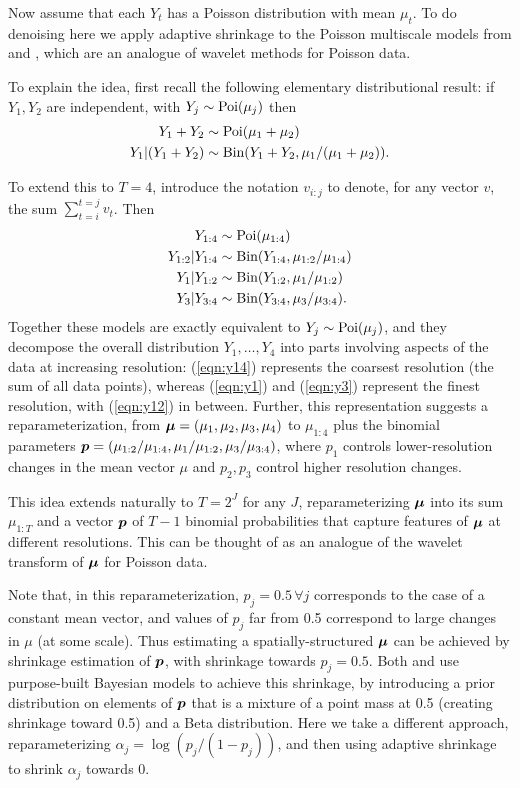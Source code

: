 \documentclass[12pt]{article}
\begin{document}
Now assume that each $Y_t$ has a Poisson distribution with mean $\mu_t$.
To do denoising here we apply adaptive shrinkage to the Poisson multiscale models
from \cite{Nowak2000Statistical} and \cite{Timmermann1999Multiscale}, which are an analogue of
wavelet methods for Poisson data.

To explain the idea, first recall the following elementary distributional result:
if $Y_1,Y_2$ are independent, with $Y_j \sim \text{Poi}(\mu_j)$ then 
\begin{align}
Y_1 + Y_2 & \sim \text{Poi}(\mu_1 + \mu_2) \\
Y_1 | (Y_1+Y_2) & \sim \text{Bin}(Y_1+Y_2, \mu_1/(\mu_1+\mu_2)).
\end{align} 

To extend this to $T=4$, introduce the notation $v_{i:j}$ to denote, for any vector $v$, 
the sum $\sum_{t=i}^{t=j} v_t$.  Then 
\begin{align} 
Y_{1:4} & \sim \text{Poi}(\mu_{1:4}) \label{eqn:y14} \\
Y_{1:2} | Y_{1:4} & \sim \text{Bin}(Y_{1:4}, \mu_{1:2}/\mu_{1:4})  \label{eqn:y12} \\
Y_1 | Y_{1:2} & \sim \text{Bin}(Y_{1:2}, \mu_1/\mu_{1:2}) \label{eqn:y1} \\ 
Y_3 | Y_{3:4} & \sim \text{Bin}(Y_{3:4}, \mu_3/\mu_{3:4}). \label{eqn:y3}
\end{align} 
Together these models are exactly equivalent to $Y_j \sim \text{Poi}(\mu_j)$, and
they decompose the overall distribution $Y_1,\dots,Y_4$ into parts involving aspects of the data at 
increasing resolution: (\ref{eqn:y14}) represents the coarsest resolution (the sum of all data points), 
whereas (\ref{eqn:y1}) and (\ref{eqn:y3}) represent the finest resolution, with (\ref{eqn:y12}) in between. 
Further, this representation suggests a reparameterization, from $\bm{\mu}=(\mu_1,\mu_2,\mu_3,\mu_4)$
to $\mu_{1:4}$ plus the binomial parameters $\bm{p}=(\mu_{1:2}/\mu_{1:4}, \mu_1/\mu_{1:2}, \mu_3/\mu_{3:4})$, where 
$p_1$ controls lower-resolution changes in the mean vector $\mu$ and $p_2,p_3$ control higher resolution changes.

This idea extends naturally to $T=2^J$ for any $J$, reparameterizing $\bm{\mu}$ into its sum $\mu_{1:T}$
and a vector $\bm{p}$ of $T-1$ binomial probabilities that capture features of $\bm{\mu}$ at different resolutions.
This can be thought of as an analogue of the wavelet transform of $\bm{\mu}$ for Poisson data.

Note that, in this reparameterization, $p_j=0.5 \, \forall j$ corresponds to the case of a constant mean vector,
and values of $p_j$ far from 0.5 correspond to large changes in $\mu$ (at some scale).
Thus estimating a spatially-structured $\bm{\mu}$ can be achieved by shrinkage estimation of $\bm{p}$, with shrinkage towards $p_j=0.5$. Both \cite{Nowak2000Statistical} and \cite{Timmermann1999Multiscale} use purpose-built Bayesian models to
achieve this shrinkage, by introducing a prior distribution on elements of $\bm{p}$ that is
a mixture of a point mass at 0.5 (creating shrinkage toward 0.5) 
and a Beta distribution. Here we take a different approach, reparameterizing $\alpha_j = \log(p_j/(1-p_j))$,
and then using adaptive shrinkage to shrink $\alpha_j$ towards 0. 
\end{document}
